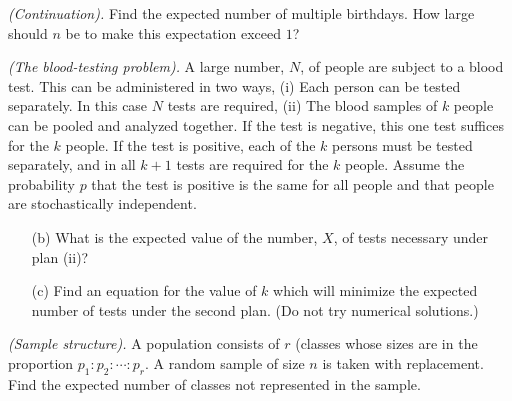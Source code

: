\begin{problem}[Handout 6, \# 11]
  \emph{(Continuation).} Find the expected number of multiple
  birthdays. How large should \(n\) be to make this expectation exceed
  \(1\)?
\end{problem}
\begin{solution}

\end{solution}
\newpage

\begin{problem}[Handout 6, \# 12]
  \emph{(The blood-testing problem).} A large number, \(N\), of people are
  subject to a blood test. This can be administered in two ways, (i) Each
  person can be tested separately. In this case \(N\) tests are required,
  (ii) The blood samples of \(k\) people can be pooled and analyzed
  together. If the test is negative, this one test suffices for the \(k\)
  people. If the test is positive, each of the \(k\) persons must be tested
  separately, and in all \(k+1\) tests are required for the \(k\)
  people. Assume the probability \(p\) that the test is positive is the
  same for all people and that people are stochastically independent.
  \begin{itemize}[noitemsep]
  \item[(b)] What is the expected value of the number, \(X\), of tests
    necessary under plan (ii)?
  \item[(c)] Find an equation for the value of \(k\) which will minimize
    the expected number of tests under the second plan. (Do not try
    numerical solutions.)
  \end{itemize}
  \end{problem}
\begin{solution}

\end{solution}
\newpage

\begin{problem}[Handout 6, \# 13]
  \emph{(Sample structure).} A population consists of \(r\) (classes whose
  sizes are in the proportion \(p_1:p_2:\dotsb:p_r\). A random sample of
  size \(n\) is taken with replacement. Find the expected number of classes
  not represented in the sample.
\end{problem}
\begin{solution}

\end{solution}

